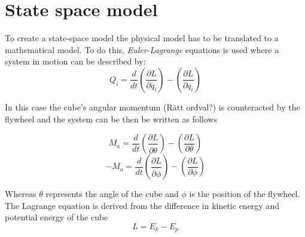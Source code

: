 \documentclass[a4paper,11pt]{kth-mag}
\begin{document}
\section{State space model}
To create a state-space model the physical model has to be translated to a mathematical model. To do this, \emph{Euler-Lagrange} equations is used where a system in motion can be described by:
\begin{equation}
Q_i=\frac{d}{dt}\left(\frac{\partial L}{\partial \dot{q_i}}\right)-\left(\frac{\partial L}{\partial q_i}\right)
\end{equation}

In this case the cube's angular momentum (Rätt ordval?) is counteracted by the flywheel and the system can be then be written as follows

\begin{equation} \label{eq:positiveL}
M_a=\frac{d}{dt}\left(\frac{\partial L}{\partial \dot{\theta}}\right)-\left(\frac{\partial L}{\partial \theta}\right)
\end{equation}
\begin{equation} \label{eq:negativeL}
-M_a=\frac{d}{dt}\left(\frac{\partial L}{\partial \dot{\phi}}\right)-\left(\frac{\partial L}{\partial \phi}\right)
\end{equation}



Whereas $\theta$ represents the angle of the cube and $\phi$ is the position of the flywheel. \\
The Lagrange equation is derived from the difference in kinetic energy and potential energy of the cube
\begin{equation} \label{eq:Lagrange}
L = E_k - E_p
\end{equation}
\end{document}
